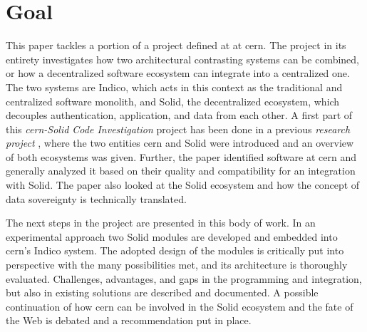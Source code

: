 \section{Goal}

This paper tackles a portion of a project defined at at \gls{cern}. The project in its entirety investigates how two architectural contrasting systems can be combined, or how a decentralized software ecosystem can integrate into a centralized one. The two systems are Indico, which acts in this context as the traditional and centralized software monolith, and Solid, the decentralized ecosystem, which decouples authentication, application, and data from each other. A first part of this \textit{\gls{cern}-Solid Code Investigation} project \cite{cern-solid-code-investigation-project-description} has been done in a previous \textit{research project} \cite{cern-solid-investigation-spec}, where the two entities \gls{cern} and Solid were introduced and an overview of both ecosystems was given. Further, the paper identified software at \gls{cern} and generally analyzed it based on their quality and compatibility for an integration with Solid. The paper also looked at the Solid ecosystem and how the concept of data sovereignty is technically translated.

The next steps in the project are presented in this body of work. In an experimental approach two Solid modules are developed and embedded into \gls{cern}'s Indico system. The adopted design of the modules is critically put into perspective with the many possibilities met, and its architecture is thoroughly evaluated. Challenges, advantages, and gaps in the programming and integration, but also in existing solutions are described and documented. A possible continuation of how \gls{cern} can be involved in the Solid ecosystem and the fate of the Web is debated and a recommendation put in place.
